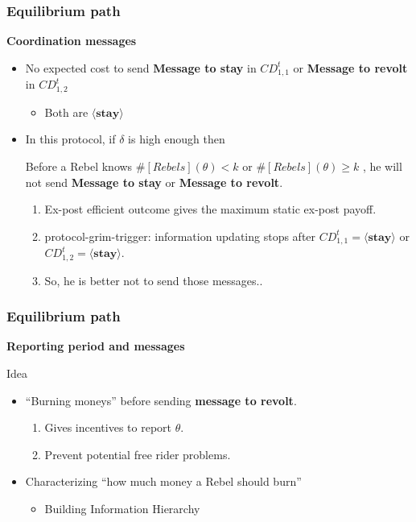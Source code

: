 \documentclass[10pt]{beamer}
\begin{document}
\begin{frame}
\frametitle{Equilibrium path}

\textbf{Coordination messages}

\begin{itemize}
\item \alert{No expected cost} to send \textbf{Message to stay} in $CD^t_{1,1}$ or \textbf{Message to revolt} in $CD^t_{1,2}$
\begin{itemize}
\item Both are $\langle \textbf{stay}\rangle$
\end{itemize}


\item In this protocol, if $\delta$ is high enough then
\begin{lemma}
Before a Rebel knows $\#[Rebels](\theta)< k$ or $\#[Rebels](\theta)\geq k$ , he will not send \textbf{Message to stay} or \textbf{Message to revolt}.
\end{lemma}
\begin{enumerate}
\item Ex-post efficient outcome gives the maximum static ex-post payoff.
\item protocol-grim-trigger: information updating stops after $CD^t_{1,1}=\langle \textbf{stay} \rangle$ or $CD^t_{1,2}=\langle \textbf{stay} \rangle$.
\item So, he is better not to send those messages..  
\end{enumerate}


\end{itemize}

\end{frame}


\begin{frame}
\frametitle{Equilibrium path}

\textbf{Reporting period and messages}

Idea

\begin{itemize}
\item ``{Burning moneys}'' before sending \textbf{message to revolt}.
\begin{enumerate}
\item Gives incentives to report $\theta$.
\item Prevent potential free rider problems.
\end{enumerate}
\item Characterizing ``how much money a Rebel should burn'' 
\begin{itemize}
\item Building Information Hierarchy
\end{itemize}

\end{itemize}

\end{frame}
\end{document}
